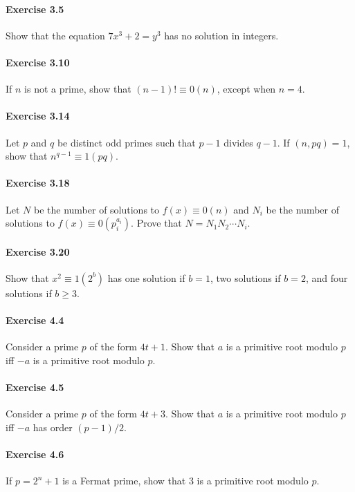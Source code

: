 \documentclass{article}
\begin{document}
\paragraph{Exercise 3.5} Show that the equation $7 x^{3}+2=y^{3}$ has no solution in integers.

\paragraph{Exercise 3.10} If $n$ is not a prime, show that $(n-1) ! \equiv 0(n)$, except when $n=4$.

\paragraph{Exercise 3.14} Let $p$ and $q$ be distinct odd primes such that $p-1$ divides $q-1$. If $(n, p q)=1$, show that $n^{q-1} \equiv 1(p q)$.

\paragraph{Exercise 3.18} Let $N$ be the number of solutions to $f(x) \equiv 0(n)$ and $N_{i}$ be the number of solutions to $f(x) \equiv 0\left(p_{i}^{a_{i}}\right)$. Prove that $N=N_{1} N_{2} \cdots N_{i}$.

\paragraph{Exercise 3.20} Show that $x^{2} \equiv 1\left(2^{b}\right)$ has one solution if $b=1$, two solutions if $b=2$, and four solutions if $b \geq 3$.

\paragraph{Exercise 4.4} Consider a prime $p$ of the form $4 t+1$. Show that $a$ is a primitive root modulo $p$ iff $-a$ is a primitive root modulo $p$.

\paragraph{Exercise 4.5} Consider a prime $p$ of the form $4 t+3$. Show that $a$ is a primitive root modulo $p$ iff $-a$ has order $(p-1) / 2$.

\paragraph{Exercise 4.6} If $p=2^{n}+1$ is a Fermat prime, show that 3 is a primitive root modulo $p$.
\end{document}

